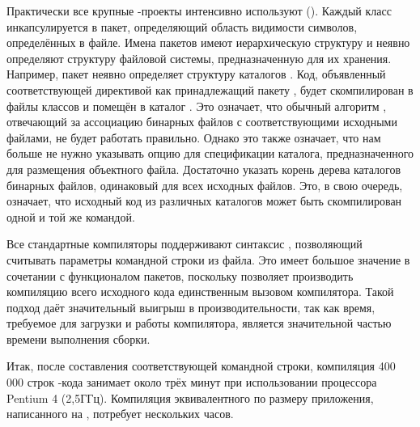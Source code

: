 Практически все крупные \Java{}\hyp{}проекты интенсивно используют
 (). Каждый класс инкапсулируется в
пакет, определяющий область видимости символов, определённых в файле.
Имена пакетов имеют иерархическую структуру и неявно определяют
структуру файловой системы, предназначенную для их хранения. Например,
пакет  неявно определяет структуру каталогов
. Код, объявленный соответствующей директивой как
принадлежащий пакету , будет скомпилирован в файлы
классов и помещён в каталог . Это означает, что
обычный алгоритм \GNUmake{}, отвечающий за ассоциацию бинарных файлов
с соответствующими исходными файлами, не будет работать правильно.
Однако это также означает, что нам больше не нужно указывать опцию
 для спецификации каталога, предназначенного для
размещения объектного файла. Достаточно указать корень дерева
каталогов бинарных файлов, одинаковый для всех исходных файлов. Это, в
свою очередь, означает, что исходный код из различных каталогов может
быть скомпилирован одной и той же командой.

Все стандартные компиляторы \Java{} поддерживают синтаксис
, позволяющий считывать параметры командной
строки из файла. Это имеет большое значение в сочетании с функционалом
пакетов, поскольку позволяет производить компиляцию всего исходного
кода единственным вызовом компилятора. Такой подход даёт значительный
выигрыш в производительности, так как время, требуемое для загрузки и
работы компилятора, является значительной частью времени выполнения
сборки.

Итак, после составления соответствующей командной строки, компиляция
400\,000 строк \Java{}\hyp{}кода занимает около трёх минут при
использовании процессора Pentium 4 (2,5ГГц). Компиляция эквивалентного
по размеру приложения, написанного на \Cplusplus{}, потребует
нескольких часов.







